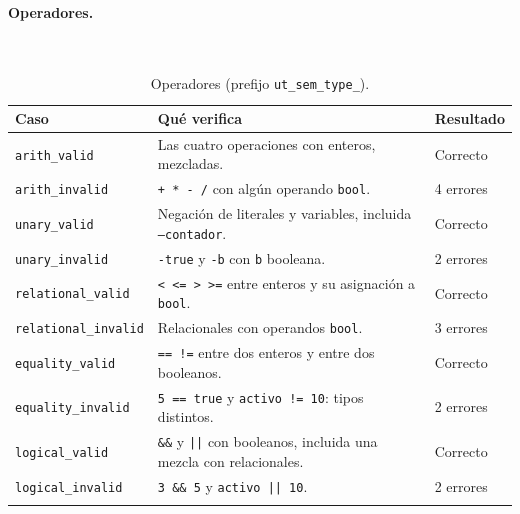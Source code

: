 \documentclass[12pt,letterpaper]{article}
\begin{document}
\paragraph{Operadores.}\mbox{}\\[0.3em]
\begin{longtable}{|p{5.2cm}|p{7.6cm}|p{3.4cm}|}
\hline
\textbf{Caso} & \textbf{Qué verifica} & \textbf{Resultado} \\ \hline \endhead
\footnotesize\texttt{arith\_valid} & \small Las cuatro operaciones con enteros, mezcladas. & \small Correcto \\ \hline
\footnotesize\texttt{arith\_invalid} & \small \texttt{+ * - /} con algún operando \texttt{bool}. & \small 4 errores \\ \hline
\footnotesize\texttt{unary\_valid} & \small Negación de literales y variables, incluida \texttt{--contador}. & \small Correcto \\ \hline
\footnotesize\texttt{unary\_invalid} & \small \texttt{-true} y \texttt{-b} con \texttt{b} booleana. & \small 2 errores \\ \hline
\footnotesize\texttt{relational\_valid} & \small \texttt{< <= > >=} entre enteros y su asignación a \texttt{bool}. & \small Correcto \\ \hline
\footnotesize\texttt{relational\_invalid} & \small Relacionales con operandos \texttt{bool}. & \small 3 errores \\ \hline
\footnotesize\texttt{equality\_valid} & \small \texttt{== !=} entre dos enteros y entre dos booleanos. & \small Correcto \\ \hline
\footnotesize\texttt{equality\_invalid} & \small \texttt{5 == true} y \texttt{activo != 10}: tipos distintos. & \small 2 errores \\ \hline
\footnotesize\texttt{logical\_valid} & \small \texttt{\&\&} y \texttt{||} con booleanos, incluida una mezcla con relacionales. & \small Correcto \\ \hline
\footnotesize\texttt{logical\_invalid} & \small \texttt{3 \&\& 5} y \texttt{activo || 10}. & \small 2 errores \\ \hline
\caption{Operadores (prefijo \texttt{ut\_sem\_type\_}).}
\end{longtable}
\end{document}
